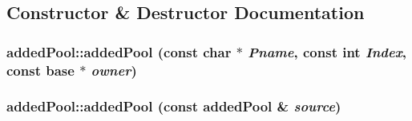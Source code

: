 \subsection{Constructor \& Destructor Documentation}
\hypertarget{classadded_pool_a13b5f518f801321e531672b6b03309d2}{
\subsubsection[{addedPool}]{\setlength{\rightskip}{0pt plus 5cm}addedPool::addedPool (const char $\ast$ {\em Pname}, \/  const int {\em Index}, \/  const {\bf base} $\ast$ {\em owner})}}
\label{classadded_pool_a13b5f518f801321e531672b6b03309d2}
\hypertarget{classadded_pool_ab5c337742c93f028dc93b7428647aa01}{
\subsubsection[{addedPool}]{\setlength{\rightskip}{0pt plus 5cm}addedPool::addedPool (const {\bf addedPool} \& {\em source})}}
\label{classadded_pool_ab5c337742c93f028dc93b7428647aa01}


